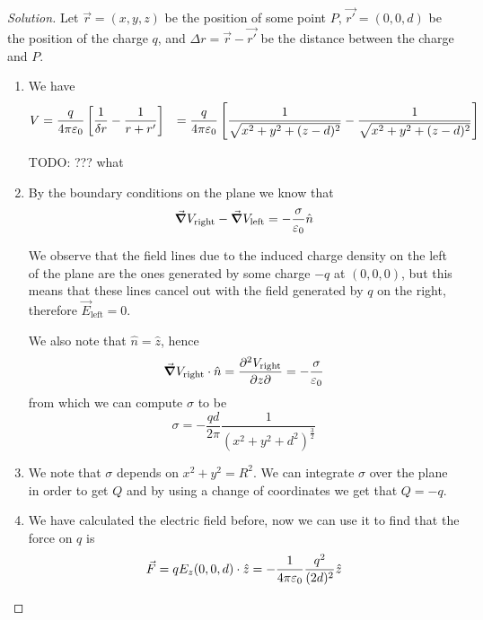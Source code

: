 \documentclass[12pt]{extarticle}
\begin{document}
\begin{proof}[Solution]
    Let $\vec r = (x, y, z)$ be the position of some point $P$, $\vec{r'} = (0,0,d)$ be the position of the charge $q$, and $\Delta r = \vec r -\vec{r'}$ be the distance between the charge and $P$.

    \begin{enumerate}[label = \alph*)]
        \item We have
              \begin{align}
                  V & =  \frac{q}{4 \pi \varepsilon_0} \left[\frac{1}{\delta r} - \frac{1}{r+r'} \right]
                    & =\frac{q}{4 \pi \varepsilon_0} \left[\frac{1}{\sqrt{x^2 + y ^2 + (z-d)^2}} - \frac{1}{\sqrt{x^2 + y ^2 + (z-d)^2}} \right]
              \end{align}

              TODO: ??? what

        \item By the boundary conditions on the plane we know that
              \begin{equation}
                  \grad V_\text{right} - \grad V_\text{left} = -\frac{\sigma}{\varepsilon_0} \hat n
              \end{equation}

              We observe that the field lines due to the induced charge density on the left of the plane are the ones generated by some charge $-q$ at $(0,0,0)$, but this means that these lines cancel out with the field generated by $q$ on the right, therefore $\vec E_\text{left}=0$.

              We also note that $\hat n = \hat z$, hence
              \begin{equation}
                  \grad V_\text{right} \cdot \hat n = \pdv{V_\text{right}}{z}{}(z=0) = -\frac{\sigma}{\varepsilon_0}
              \end{equation}
              from which we can compute $\sigma$ to be
              \begin{equation}
                  \sigma = - \frac{qd}{2\pi} \frac{1}{(x^2 + y^2 + d^2)^{\frac{3}{2}}}
              \end{equation}

        \item We note that $\sigma$ depends on $x^2 + y^2 = R^2$.
              We can integrate $\sigma$ over the plane in order to get $Q$ and by using a change of coordinates we get that $Q=-q$.
        \item We have calculated the electric field before, now we can use it to find that the force on $q$ is
              \begin{equation}
                  \vec F = q E_z (0,0,d) \cdot \hat z = - \frac{1}{4 \pi \varepsilon_0} \frac{q^2}{(2d)^2}\hat z
              \end{equation}


\end{enumerate}
\end{proof}
\end{document}

